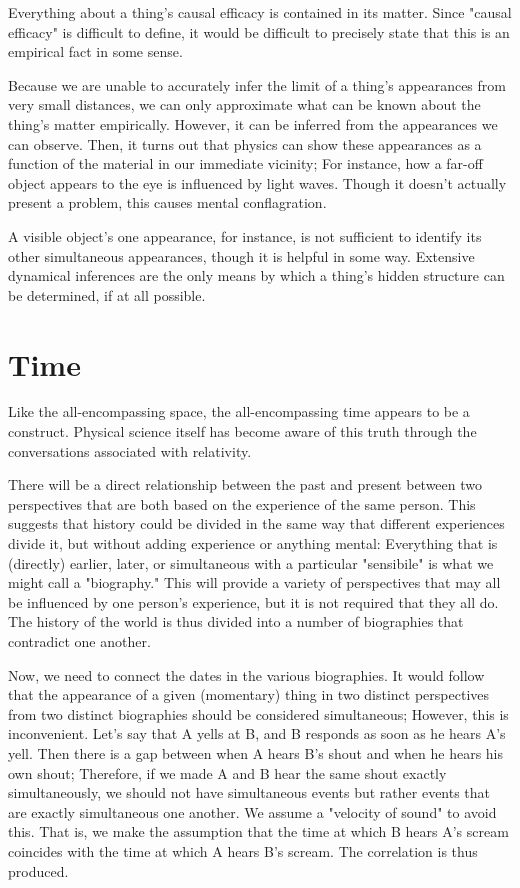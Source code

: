 \documentclass[a4paper,12pt]{book}[2004/02/16]
\theoremstyle{ilemma}
\theoremstyle{itheorem}
\theoremstyle{iother}
\theoremstyle{icorollary}
\theoremstyle{numcorollary}
\theoremstyle{idefinition}
\begin{document}
Everything about a thing's causal efficacy is contained in its matter. Since "causal efficacy" is difficult to define, it would be difficult to precisely state that this is an empirical fact in some sense.

Because we are unable to accurately infer the limit of a thing's appearances from very small distances, we can only approximate what can be known about the thing's matter empirically. However, it can be inferred from the appearances we can observe. Then, it turns out that physics can show these appearances as a function of the material in our immediate vicinity; For instance, how a far-off object appears to the eye is influenced by light waves.
Though it doesn't actually present a problem, this causes mental conflagration.

A visible object's one appearance, for instance, is not sufficient to identify its other simultaneous appearances, though it is helpful in some way. Extensive dynamical inferences are the only means by which a thing's hidden structure can be determined, if at all possible.

\section{Time}
Like the all-encompassing space, the all-encompassing time appears to be a construct. Physical science itself has become aware of this
truth through the conversations associated with relativity.

There will be a direct relationship between the past and present between two perspectives that are both based on the experience of the same person. This suggests that history could be divided in the same way that different experiences divide it, but without adding experience or anything mental: Everything that is (directly) earlier, later, or simultaneous with a particular "sensibile" is what we might call a "biography." This will provide a variety of perspectives that may all be influenced by one person's experience, but it is not required that they all do. The history of the world is thus divided into a number of biographies that contradict one another.

Now, we need to connect the dates in the various biographies. It would follow that the appearance of a given (momentary) thing in two distinct perspectives from two distinct biographies should be considered simultaneous; However, this is inconvenient. Let's say that A yells at B, and B responds as soon as he hears A's yell. Then there is a gap between when A hears B's shout and when he hears his own shout; Therefore, if we made A and B hear the same shout exactly simultaneously, we should not have simultaneous events but rather events that are exactly simultaneous one another. We assume a "velocity of sound" to avoid this.
That is, we make the assumption that the time at which B hears A's scream coincides with the time at which A hears B's scream. The correlation is thus produced.
\end{document}

